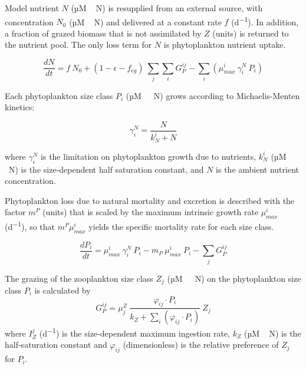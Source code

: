\documentclass[journal abbreviation, manuscript]{copernicus}
\begin{document}
Model nutrient $N$ (\unit{µM\,N}) is resupplied from an external source, with concentration $N_0$ (\unit{µM\,N}) and delivered at a constant rate $f$ (\unit{d^{-1}}). In addition, a fraction of grazed biomass that is not assimilated by $Z$ (units) is returned to the nutrient pool. The only loss term for $N$ is phytoplankton nutrient uptake.

\begin{equation}
    \label{Eq:BanasNut}
    \frac{d N}{d t} = 
    f \ N_0 %
    +  (1- \epsilon - f_{eg}) \ \sum_{j} \sum_{i} G_P^{ij} %
    - \sum_{i} ( \mu_{max}^i \ \gamma_i^N \ P_i) %
\end{equation}

Each phytoplankton size class $P_i$ (\unit{µM \ N}) grows according to Michaelis-Menten kinetics:

\begin{equation}
    \gamma_i^N =  \frac{N}{k_N^i + N} 
\end{equation}

where $\gamma_i^N$ is the limitation on phytoplankton growth due to nutrients, $k_N^i$ (\unit{µM\,N}) is the size-dependent half saturation constant, and $N$ is the ambient nutrient concentration.

Phytoplankton loss due to natural mortality and excretion is described with the factor $m^P$ (units) that is scaled by the maximum intrinsic growth rate $\mu_{max}^i$ (\unit{d^{-1}}), so that $m^P \mu_{max}^i$ yields the specific mortality rate for each size class.

\begin{equation}
    \label{Eq:BanasPhyto}
    \frac{d P_i}{d t} =
    \mu_{max}^i \  \gamma_i^N \   P_i  %
    - m_P  \ \mu_{max}^i \ P_i %
    - \sum_{j} G_P^{ij} %
\end{equation}


The grazing of the zooplankton size class $Z_j$ (\unit{µM \ N}) on the phytoplankton size class $P_i$ is calculated by
\begin{equation}
    G_P^{ij} = \mu_j^Z \ \frac{ \varphi_{ij} \cdot P_i }{ k_Z + \sum_{i}(\varphi_{ij} \cdot P_i) } \ Z_j
\end{equation}
where $I_Z^j$ (\unit{d^{-1}}) is the size-dependent maximum ingestion rate, $k_Z$ (\unit{µM\,N}) is the half-saturation constant and $\varphi_{ij}$ (dimensionless) is the relative preference of $Z_j$ for $P_i$.
\end{document}
